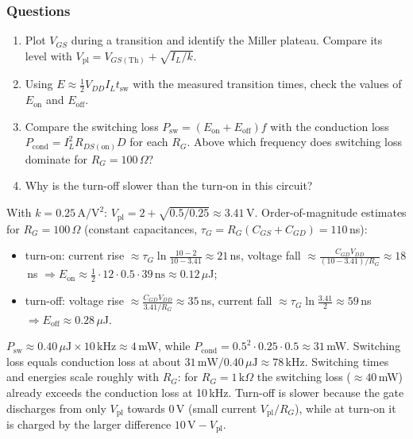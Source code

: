 \subsubsection*{Questions}
\begin{enumerate}[itemsep=2pt]
  \item Plot $V_{GS}$ during a transition and identify the Miller plateau. Compare its level with
        $V_{\mathrm{pl}} = V_{GS(\mathrm{Th})} + \sqrt{I_L/k}$.
  \item Using $E \approx \tfrac12 V_{DD} I_L t_{\mathrm{sw}}$ with the measured transition times, check the values of $E_{\mathrm{on}}$ and $E_{\mathrm{off}}$.
  \item Compare the switching loss $P_{\mathrm{sw}} = (E_{\mathrm{on}}+E_{\mathrm{off}})f$ with the conduction loss
        $P_{\mathrm{cond}} = I_L^2 R_{DS(\mathrm{on})} D$ for each $R_G$. Above which frequency does switching loss dominate for $R_G = 100\,\Omega$?
  \item Why is the turn-off slower than the turn-on in this circuit?
\end{enumerate}
\begin{solution}
With $k = 0.25\,\mathrm{A/V^2}$: $V_{\mathrm{pl}} = 2 + \sqrt{0.5/0.25} \approx 3.41$\,V.
Order-of-magnitude estimates for $R_G = 100\,\Omega$ (constant capacitances, $\tau_G = R_G(C_{GS}+C_{GD}) = 110$\,ns):
\begin{itemize}[itemsep=1pt]
  \item turn-on: current rise $\approx \tau_G\ln\frac{10-2}{10-3.41} \approx 21$\,ns, voltage fall $\approx \frac{C_{GD}V_{DD}}{(10-3.41)/R_G} \approx 18$\,ns
        $\Rightarrow E_{\mathrm{on}} \approx \tfrac12\cdot12\cdot0.5\cdot39\,\mathrm{ns} \approx 0.12\,\mu$J;
  \item turn-off: voltage rise $\approx \frac{C_{GD}V_{DD}}{3.41/R_G} \approx 35$\,ns, current fall $\approx \tau_G\ln\frac{3.41}{2} \approx 59$\,ns
        $\Rightarrow E_{\mathrm{off}} \approx 0.28\,\mu$J.
\end{itemize}
$P_{\mathrm{sw}} \approx 0.40\,\mu\mathrm{J}\times 10\,\mathrm{kHz} \approx 4$\,mW, while
$P_{\mathrm{cond}} = 0.5^2\cdot0.25\cdot0.5 \approx 31$\,mW. Switching loss equals conduction loss at about
$31\,\mathrm{mW}/0.40\,\mu\mathrm{J} \approx 78$\,kHz. Switching times and energies scale roughly with $R_G$: for $R_G = 1\,\mathrm{k}\Omega$
the switching loss ($\approx 40$\,mW) already exceeds the conduction loss at 10\,kHz.
Turn-off is slower because the gate discharges from only $V_{\mathrm{pl}}$ towards 0\,V (small current $V_{\mathrm{pl}}/R_G$), while at
turn-on it is charged by the larger difference $10\,\mathrm{V}-V_{\mathrm{pl}}$.
\end{solution}
